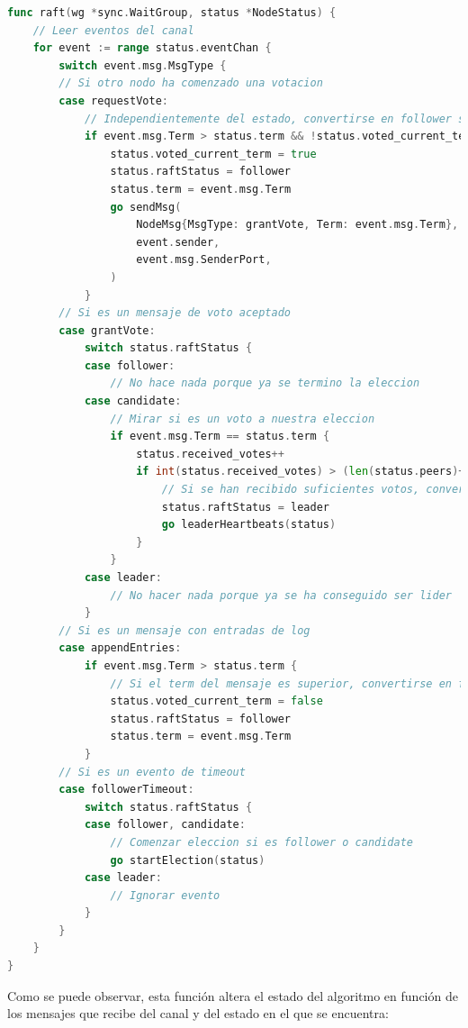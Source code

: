 \begin{lstlisting}[language=go]
func raft(wg *sync.WaitGroup, status *NodeStatus) {
	// Leer eventos del canal
	for event := range status.eventChan {
		switch event.msg.MsgType {
		// Si otro nodo ha comenzado una votacion		
		case requestVote:
			// Independientemente del estado, convertirse en follower si el term del mensaje es superior y si no se ha votado en el term actual
			if event.msg.Term > status.term && !status.voted_current_term {
				status.voted_current_term = true
				status.raftStatus = follower
				status.term = event.msg.Term
				go sendMsg(
					NodeMsg{MsgType: grantVote, Term: event.msg.Term},
					event.sender,
					event.msg.SenderPort,
				)
			}
		// Si es un mensaje de voto aceptado
		case grantVote:
			switch status.raftStatus {
			case follower:
				// No hace nada porque ya se termino la eleccion
			case candidate:
				// Mirar si es un voto a nuestra eleccion
				if event.msg.Term == status.term {
					status.received_votes++
					if int(status.received_votes) > (len(status.peers)+1)/2 {
						// Si se han recibido suficientes votos, convertirse en lider
						status.raftStatus = leader
						go leaderHeartbeats(status)
					}
				}
			case leader:
				// No hacer nada porque ya se ha conseguido ser lider
			}
		// Si es un mensaje con entradas de log
		case appendEntries:
			if event.msg.Term > status.term {
				// Si el term del mensaje es superior, convertirse en follower
				status.voted_current_term = false
				status.raftStatus = follower
				status.term = event.msg.Term
			}
		// Si es un evento de timeout
		case followerTimeout:
			switch status.raftStatus {
			case follower, candidate:
				// Comenzar eleccion si es follower o candidate
				go startElection(status)
			case leader:
				// Ignorar evento
			}
		}
	}
}
\end{lstlisting}

Como se puede observar, esta función altera el estado del algoritmo en función de los mensajes que recibe del canal y del estado en el que se encuentra:

